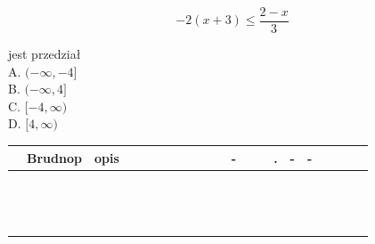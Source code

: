 \documentclass[10pt]{article}
\begin{document}
\[
-2(x+3) \leq \frac{2-x}{3}
\]

jest przedział\\
A. \((-\infty,-4]\)\\
B. \((-\infty, 4]\)\\
C. \([-4, \infty)\)\\
D. \([4, \infty)\)

\begin{center}
\begin{tabular}{|c|c|c|c|c|c|c|c|c|c|c|c|c|c|c|c|c|c|c|c|c|}
\hline
 & Brudnop & opis &  &  &  &  &  &  &  &  & - &  &  & . & - & - &  &  &  &  \\
\hline
 &  &  &  &  &  &  &  &  &  &  &  &  &  &  &  &  &  &  &  &  \\
\hline
 &  &  &  &  &  &  &  &  &  &  &  &  &  &  &  &  &  &  &  &  \\
\hline
 &  &  &  &  &  &  &  &  &  &  &  &  &  &  &  &  &  &  &  &  \\
\hline
 &  &  &  &  &  &  &  &  &  &  &  &  &  &  &  &  &  &  &  &  \\
\hline
 &  &  &  &  &  &  &  &  &  &  &  &  &  &  &  &  &  &  &  &  \\
\hline
 &  &  &  &  &  &  &  &  &  &  &  &  &  &  &  &  &  &  &  &  \\
\hline
 &  &  &  &  &  &  &  &  &  &  &  &  &  &  &  &  &  &  &  &  \\
\hline
 &  &  &  &  &  &  &  &  &  &  &  &  &  &  &  &  &  &  &  &  \\
\hline
 &  &  &  &  &  &  &  &  &  &  &  &  &  &  &  &  &  &  &  &  \\
\hline
 &  &  &  &  &  &  &  &  &  &  &  &  &  &  &  &  &  &  &  &  \\
\hline
 &  &  &  &  &  &  &  &  &  &  &  &  &  &  &  &  &  &  &  &  \\
\hline
 &  &  &  &  &  &  &  &  &  &  &  &  &  &  &  &  &  &  &  &  \\
\hline
 &  &  &  &  &  &  &  &  &  &  &  &  &  &  &  &  &  &  &  &  \\
\hline
 &  &  &  &  &  &  &  &  &  &  &  &  &  &  &  &  &  &  &  &  \\
\hline
\end{tabular}
\end{center}
\end{document}
